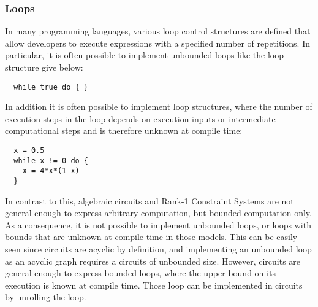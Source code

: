 \subsubsection{Loops} In many programming languages, various loop control structures are defined that allow developers to execute expressions with a specified number of repetitions. In particular, it is often possible to implement unbounded loops like the loop structure give below:
\begin{lstlisting}
  while true do { }
\end{lstlisting}
In addition it is often possible to implement loop structures, where the number of execution steps in the loop depends on execution inputs or intermediate computational steps and is therefore unknown at compile time: 
\begin{lstlisting}
  x = 0.5
  while x != 0 do { 
    x = 4*x*(1-x) 
  }
\end{lstlisting}

In contrast to this, algebraic circuits and Rank-1 Constraint Systems are not general enough to express arbitrary computation, but bounded computation only. As a consequence,  it is not possible to implement unbounded loops, or loops with bounds that are unknown at compile time in those models. This can be easily seen since circuits are acyclic by definition, and implementing an unbounded loop as an acyclic graph requires a circuits of unbounded size.  However, circuits are general enough to express bounded loops, where the upper bound on its execution is known at compile time. Those loop can be implemented in circuits by unrolling the loop. 

